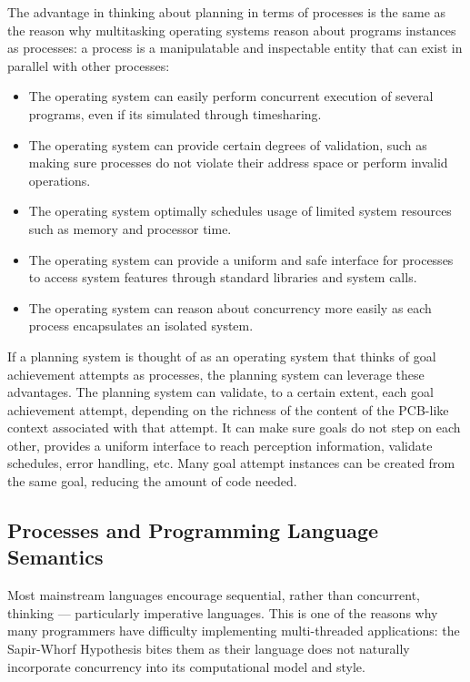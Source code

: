 The advantage in thinking about planning in terms of processes is the same as the reason why multitasking operating systems reason about programs instances as processes: a process is a manipulatable and inspectable entity that can exist in parallel with other processes:
\begin{itemize}
\item The operating system can easily perform concurrent execution of several programs, even if its simulated through timesharing.
\item The operating system can provide certain degrees of validation, such as making sure processes do not violate their address space or perform invalid operations.
\item The operating system optimally schedules usage of limited system resources such as memory and processor time.
\item The operating system can provide a uniform and safe interface for processes to access system features through standard libraries and system calls.
\item The operating system can reason about concurrency more easily as each process encapsulates an isolated system.
\end{itemize}

If a planning system is thought of as an operating system that thinks of goal achievement attempts as processes, the planning system can leverage these advantages. The planning system can validate, to a certain extent, each goal achievement attempt, depending on the richness of the content of the PCB-like context associated with that attempt. It can make sure goals do not step on each other, provides a uniform interface to reach perception information, validate schedules, error handling, etc. Many goal attempt instances can be created from the same goal, reducing the amount of code needed.

\subsection{Processes and Programming Language Semantics}
Most mainstream languages encourage sequential, rather than concurrent, thinking --- particularly imperative languages. This is one of the reasons why many programmers have difficulty implementing multi-threaded applications: the Sapir-Whorf Hypothesis bites them as their language does not naturally incorporate concurrency into its computational model and style. 


